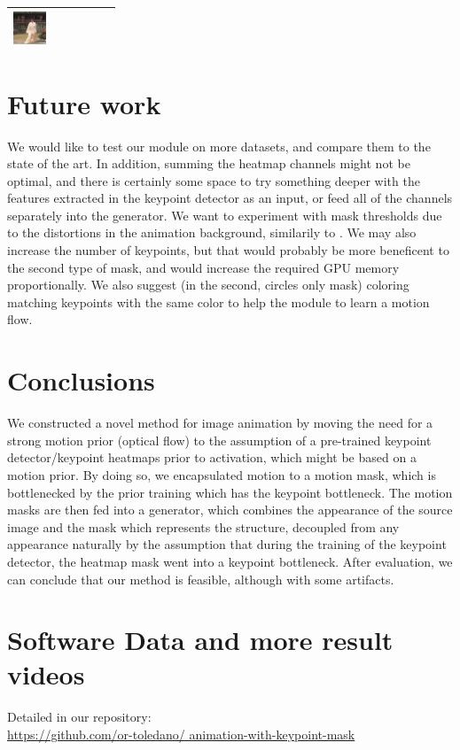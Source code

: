 \documentclass{article}
\begin{document}
\begin{table}[t]
\begin{center}
\begin{small}
\begin{sc}
\begin{tabular}{m{1.0cm}m{1.0cm}m{1.0cm}m{1.0cm}m{1.0cm}m{1.0cm}}
\includegraphics[width=1cm, height=1cm]{images/softmax/06.png} \\
\bottomrule
\end{tabular}
\end{sc}
\end{small}
\end{center}
\vskip -0.1in
\end{table}


\section{Future work}
\label{future}
We would like to test our module on more datasets, and compare them to the
state of the art. In addition, summing the heatmap channels might not be
optimal, and there is certainly some space to try something deeper with the
features extracted in the keypoint detector as an input, or feed all of the
channels separately into the generator. We want to experiment with
mask thresholds due to the distortions in the animation background,
similarily to \cite{shalev2020image}.
We may also increase the number of keypoints, but that would probably be
more beneficent to the second type of mask, and would increase the
required GPU memory proportionally. We also suggest (in the second, circles
only mask) coloring
matching keypoints with the same color to help the module to learn a motion
flow.

\section{Conclusions}
We constructed a novel method for image animation by moving the need for
a strong motion prior (optical flow) to the assumption of a pre-trained
keypoint detector/keypoint heatmaps prior to activation, which might be
based on a motion prior.
By doing so, we encapsulated motion to a motion mask, which is
bottlenecked by the prior training which has the keypoint bottleneck.
The motion masks are then fed into a generator, which combines the
appearance of the source image and the mask which represents the structure,
decoupled from any appearance naturally by the assumption that during the
training of the keypoint detector, the heatmap mask went into a keypoint
bottleneck. After evaluation, we can conclude that our method is
feasible, although with some artifacts.
\section*{Software Data and more result videos}
Detailed in our repository:
\\
\url{https://github.com/or-toledano/
animation-with-keypoint-mask}


\end{document}
